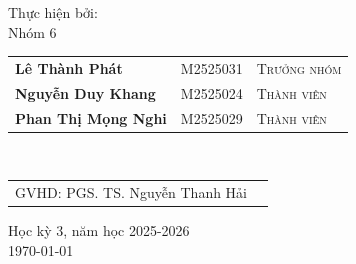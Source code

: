 \documentclass[12pt,openany]{book}
\begin{document}
\begin{titlepage}
\begin{center}
		\end{center}
		
		\vfill
			
		\begin{center}
			
  	\large	Thực hiện bởi: \\[1cm] 
	 \Large 	Nhóm 6 \\ %
			\begin{tabular}{lll}
\textbf{Lê Thành Phát}  &  \textsc{M2525031} & \textsc{Trưởng nhóm} \\
	\textbf{Nguyễn Duy Khang}  &  \textsc{M2525024} & \textsc{Thành viên} \\
	\textbf{Phan Thị Mọng Nghi}  &  \textsc{M2525029} & \textsc{Thành viên} \\
				
			\end{tabular}
	\\[1cm] 
			\begin{tabular}{ll}
			      GVHD:  PGS. TS. Nguyễn Thanh Hải \\
				
			\end{tabular}

      
   
		

		
	
			
			\vspace{1cm}	
  \normalsize Học kỳ 3, năm học 2025-2026\\
\normalsize \today 		%
   \end{center}
	\end{titlepage}



\pagestyle{fancy}

\fancyhead{}

\renewcommand{\chaptermark}[1]{\markboth{\textsc{#1}}{}}


\frontmatter

\tableofcontents
{}

\listoffigures
{}

\listoftables
{}



\mainmatter
\end{document}
